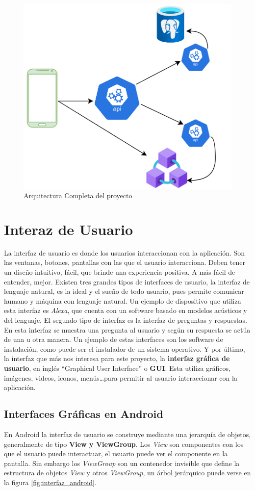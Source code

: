 \begin{figure}[h!]
  \centering
  \includegraphics[width=0.4\linewidth]{figs/Desarrollo/Arquitectura}
  \caption[Arquitectura]{Arquitectura Completa del proyecto}
  \label{fig:estublockArch}
\end{figure}

\section{Interaz de Usuario}

La interfaz de usuario es donde los usuarios interaccionan con la aplicación. Son las ventanas, botones, pantallas con las que el usuario interacciona. Deben tener un diseño intuitivo, fácil, que brinde una experiencia positiva. A más fácil de entender, mejor. Existen tres grandes tipos de interfaces de usuario, la interfaz de lenguaje natural, es la ideal y el sueño de todo usuario, pues permite comunicar humano y máquina con lenguaje natural. Un ejemplo de dispositivo que utiliza esta interfaz es \emph{Alexa}, que cuenta con un software basado en modelos acústicos y del lenguaje. El segundo tipo de interfaz es la interfaz de preguntas y respuestas. En esta interfaz se muestra una pregunta al usuario y según su respuesta se actúa de una u otra manera. Un ejemplo de estas interfaces son los software de instalación, como puede ser el instalador de un sistema operativo. Y por último, la interfaz que más nos interesa para este proyecto, la \textbf{interfaz gráfica de usuario}, en inglés ``Graphical User Interface'' o \textbf{GUI}. Esta utiliza gráficos, imágenes, videos, iconos, menús\dots para permitir al usuario interaccionar con la aplicación. 

\subsection{Interfaces Gráficas en Android} \label{sec:GUI}

En Android la interfaz de usuario se construye mediante una jerarquía de objetos, generalmente de tipo \textbf{View y ViewGroup}. Los \emph{View} son componentes con los que el usuario puede interactuar, el usuario puede ver el componente en la pantalla. Sin embargo los \emph{ViewGroup} son un contenedor invisible que define la estructura de objetos \emph{View} y otros \emph{ViewGroup}, un árbol jerárquico puede verse en la figura \ref{fig:interfaz_android}.

